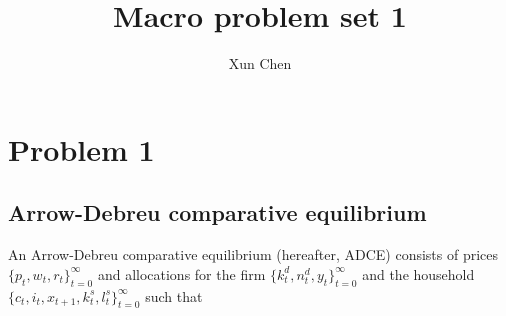 \documentclass[12pt,notitlepage]{article}%
\numberwithin{equation}{section}
\begin{document}
	
	\title{Macro problem set 1}
	\author{Xun Chen}
		\maketitle
	




\section{Problem 1}
	\subsection{Arrow-Debreu comparative equilibrium}
	An Arrow-Debreu comparative equilibrium (hereafter, ADCE) consists of prices $\{p_t, w_t, r_t\}_{t=0}^{\infty}$ and allocations for the firm $\{k_t^d, n_t^d, y_t\}_{t=0}^{\infty}$ and the household $\{c_t, i_t, x_{t+1}, k_t^s, l_t^s \}_{t=0}^{\infty}$ such that
\end{document}
